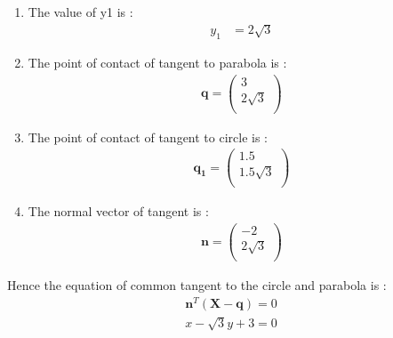 \documentclass[journal,10pt,twocolumn]{article}
\let\vec\mathbf
\begin{document}
\begin{enumerate}
\item The value of y1 is :
\begin{align}
y_1&=2\sqrt{3}
\end{align}
 \item The point of contact of tangent to parabola is :
\begin{align}
\vec{q}=
\begin{pmatrix}
3 \\
2\sqrt{3} \\
\end{pmatrix}
\end{align}
\item The point of contact of tangent to circle is :
\begin{align}
\vec{q_1}=
\begin{pmatrix}
1.5 \\
1.5\sqrt{3} \\
\end{pmatrix}
\end{align}
\item The normal vector of tangent is :
\begin{align}
\vec{n}=
\begin{pmatrix}
-2 \\
2\sqrt{3} \\
\end{pmatrix}
\end{align}
\end{enumerate}
Hence the equation of common tangent to the circle and parabola is :
\begin{align}
\vec{n}^{T}(\vec{X}-\vec{q})=0
\end{align}
\begin{align}
x-\sqrt{3}y+3=0
\end{align}
\end{document}
